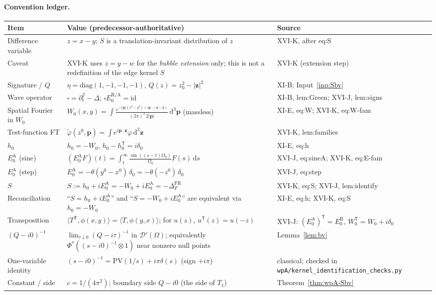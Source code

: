 \documentclass{article}
\theoremstyle{remark}
\begin{document}
\paragraph{Convention ledger.}
\label{sec:wpA-conventions}
\begin{center}
\small
\begin{longtable}{p{}p{}p{}}
\hline
Item & Value (predecessor-authoritative) & Source\\
\hline
\endhead
Difference variable & $z=x-y$; $S$ is a translation-invariant distribution of $z$ & XVI-K, after eq:S\\
Caveat & XVI-K uses $z=y-w$ for the \emph{bubble extension} only; this is not a redefinition of the edge kernel $S$ & XVI-K (extension step)\\
Signature / $Q$ & $\eta=\mathrm{diag}(1,-1,-1,-1)$, $Q(z)=z_0^2-|\mathbf z|^2$ & XI-B; Input~\ref{inp:Sbv}\\
Wave operator & $\square=\partial_t^2-\Delta$; $\square E_0^{\mathrm{R/A}}=\mathrm{id}$ & XI-B, lem:Green; XVI-J, lem:signs\\
Spatial Fourier in $W_0$ & $W_0(x,y)=\int\frac{e^{-i|\mathbf p|(x^0-y^0)+i\mathbf p\cdot(\mathbf x-\mathbf y)}}{(2\pi)^3\,2|\mathbf p|}\,\mathrm d^3\mathbf p$ (massless) & XI-E, eq:W; XVI-K, eq:W-fam\\
Test-function FT & $\tilde\varphi(z^0,\mathbf p)=\int e^{i\mathbf p\cdot\mathbf z}\varphi\,\mathrm d^3\mathbf z$ & XVI-K, lem:families\\
$h_0$ & $h_0=-W_0$, $h_0-h_0^{\mathsf T}=i\delta_0$ & XI-E, eq:h\\
$E_0^{\mathrm A}$ (sine) & $(E_0^{\mathrm A}F)(t)=\int_t^\infty\frac{\sin((s-t)\Omega_0)}{\Omega_0}F(s)\,\mathrm ds$ & XVI-J, eq:sineA; XVI-K, eq:E-fam\\
$E_0^{\mathrm A}$ (step) & $E_0^{\mathrm A}=-\theta(y^0-x^0)\,\delta_0=-\theta(-z^0)\,\delta_0$ & XVI-J, eq:step\\
$S$ & $S:=h_0+iE_0^{\mathrm A}=-W_0+iE_0^{\mathrm A}=-\Delta_F^{\mathrm{FR}}$ & XVI-K, eq:S; XVI-J, lem:identify\\
Reconciliation & ``$S=h_0+iE_0^{\mathrm A}$'' and ``$S=-W_0+iE_0^{\mathrm A}$'' are equivalent via $h_0=-W_0$ & XI-E, eq:h; XVI-K, eq:S\\
Transposition & $\langle T^{\mathsf T},\phi(x,y)\rangle=\langle T,\phi(y,x)\rangle$; for $u(z)$, $u^{\mathsf T}(z)=u(-z)$ & XVI-J: $(E_0^{\mathrm A})^{\mathsf T}=E_0^{\mathrm R}$, $W_0^{\mathsf T}=W_0+i\delta_0$\\
$(Q-i0)^{-1}$ & $\lim_{\tau\downarrow0}(Q-i\tau)^{-1}$ in $\mathcal D'(\Omega)$; equivalently $\Phi^*((s-i0)^{-1}\otimes1)$ near nonzero null points & Lemma~\ref{lem:bv}\\
One-variable identity & $(s-i0)^{-1}=\mathrm{PV}(1/s)+i\pi\delta(s)$ (sign $+i\pi$) & classical; checked in \texttt{wpA/kernel\_\allowbreak identification\_\allowbreak checks.py}\\
Constant / side & $c=1/(4\pi^2)$; boundary side $Q-i0$ (the side of $T_1$) & Theorem~\ref{thm:wpA-Sbv}\\
\hline
\end{longtable}
\end{center}
\end{document}
